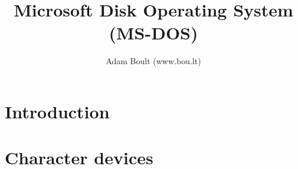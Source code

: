 \documentclass[oneside]{book}
\begin{document}
\author{Adam Boult (www.bou.lt)}
\title{Microsoft Disk Operating System (MS-DOS)}
\maketitle

\setcounter{tocdepth}{0}
\tableofcontents



\part{Introduction}

\part{Character devices}

\end{document}
